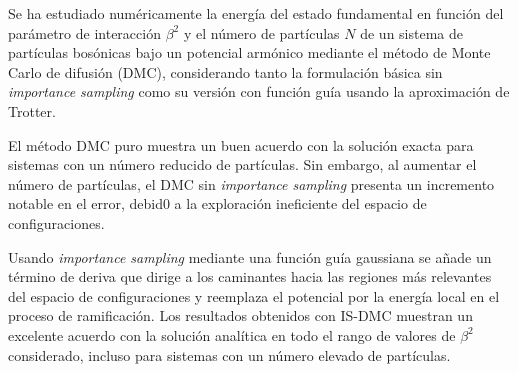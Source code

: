 \documentclass[11pt,a4paper,twoside,pdf]{article}
\numberwithin{equation}{section}
\begin{document}
Se ha estudiado numéricamente la energía del estado fundamental en función del parámetro de interacción $\beta^2$ y el número de partículas $N$ de un sistema de partículas bosónicas bajo un potencial armónico mediante el método de Monte Carlo de difusión (DMC), considerando tanto la formulación básica sin \textit{importance sampling} como su versión con función guía usando la aproximación de Trotter.

El método DMC puro muestra un buen acuerdo con la solución exacta para sistemas con un número reducido de partículas. Sin embargo, al aumentar el número de partículas, el DMC sin \textit{importance sampling} presenta un incremento notable en el error, debid0 a la exploración ineficiente del espacio de configuraciones.

Usando \textit{importance sampling} mediante una función guía gaussiana se añade un término de deriva que dirige a los caminantes hacia las regiones más relevantes del espacio de configuraciones y reemplaza el potencial por la energía local en el proceso de ramificación. Los resultados obtenidos con IS-DMC muestran un excelente acuerdo con la solución analítica en todo el rango de valores de $\beta^2$ considerado, incluso para sistemas con un número elevado de partículas.









\newpage




\end{document}
